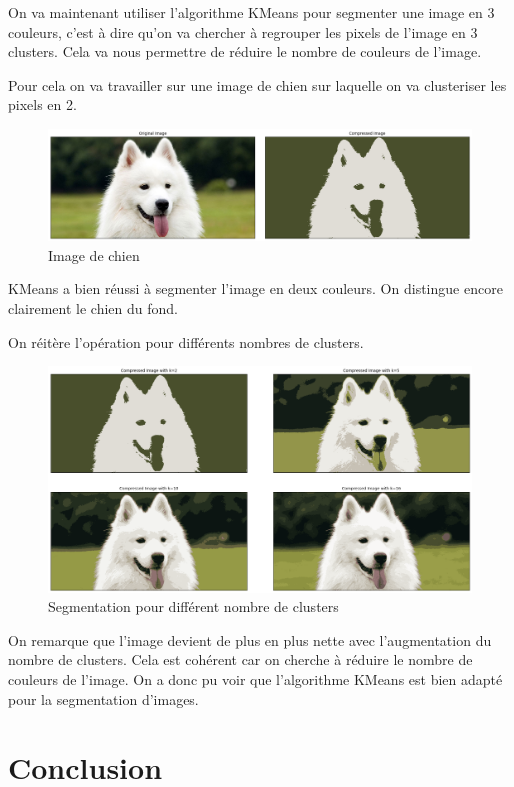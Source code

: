 \documentclass[french,a4paper,18pt]{article}
\begin{document}
On va maintenant utiliser l'algorithme KMeans pour segmenter une image en 3 couleurs,
c'est à dire qu'on va chercher à regrouper les pixels de l'image en 3 clusters.
Cela va nous permettre de réduire le nombre de couleurs de l'image.

Pour cela on va travailler sur une image de chien sur laquelle on va clusteriser
les pixels en 2.
\begin{figure}[h!]
    \centering
    \includegraphics[scale=0.2]{../images/dog_compressed.png}
    \caption{Image de chien}\label{fig:dog}
\end{figure}


KMeans a bien réussi à segmenter l'image en deux couleurs. On distingue encore clairement le chien du fond.

On réitère l'opération pour différents nombres de clusters.

\begin{figure}[h!]
    \centering
    \includegraphics[scale=0.2]{../images/dog_segmented_comparaison.png}
    \caption{Segmentation pour différent nombre de clusters}\label{fig:dog_kmeans}
\end{figure}

On remarque que l'image devient de plus en plus nette avec l'augmentation du nombre de clusters.
Cela est cohérent car on cherche à réduire le nombre de couleurs de l'image.
On a donc pu voir que l'algorithme KMeans est bien adapté pour la segmentation d'images.

\section{Conclusion}
\end{document}
